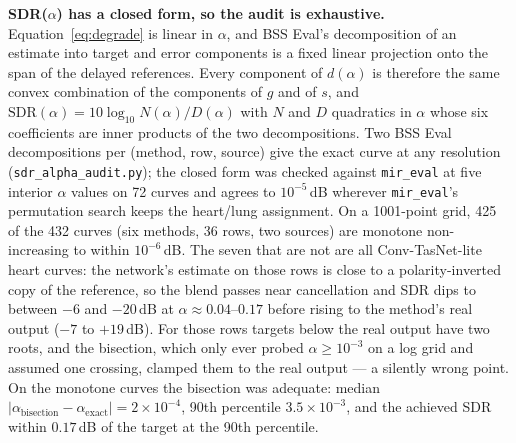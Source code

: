\documentclass[11pt]{article}
\begin{document}
\textbf{SDR($\alpha$) has a closed form, so the audit is exhaustive.}
Equation~\ref{eq:degrade} is linear in $\alpha$, and BSS Eval's
decomposition of an estimate into target and error components is a fixed
linear projection onto the span of the delayed references. Every
component of $d(\alpha)$ is therefore the same convex combination of the
components of $g$ and of $s$, and
$\text{SDR}(\alpha) = 10\log_{10} N(\alpha)/D(\alpha)$ with $N$ and $D$
quadratics in $\alpha$ whose six coefficients are inner products of the two
decompositions. Two BSS Eval decompositions per (method, row, source) give
the exact curve at any resolution (\texttt{sdr\_alpha\_audit.py}); the
closed form was checked against \texttt{mir\_eval} at five interior
$\alpha$ values on 72 curves and agrees to $10^{-5}$\,dB wherever
\texttt{mir\_eval}'s permutation search keeps the heart/lung assignment.
On a 1001-point grid, 425 of the 432 curves (six methods, 36 rows, two
sources) are monotone non-increasing to within $10^{-6}$\,dB. The seven
that are not are all Conv-TasNet-lite heart curves: the network's
estimate on those rows is close to a polarity-inverted copy of the
reference, so the blend passes near cancellation and SDR dips to between
$-6$ and $-20$\,dB at $\alpha \approx 0.04$--$0.17$ before rising to the
method's real output ($-7$ to $+19$\,dB). For those rows targets below the
real output have two roots, and the bisection, which only ever probed
$\alpha \ge 10^{-3}$ on a log grid and assumed one crossing, clamped them
to the real output --- a silently wrong point. On the monotone curves the
bisection was adequate: median $|\alpha_{\text{bisection}} -
\alpha_{\text{exact}}| = 2\times10^{-4}$, 90th percentile
$3.5\times10^{-3}$, and the achieved SDR within $0.17$\,dB of the target
at the 90th percentile.
\end{document}

